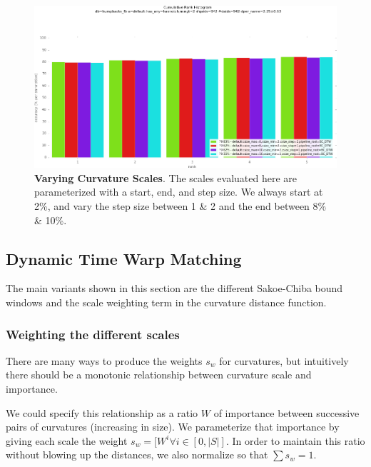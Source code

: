 \begin{figure}[t]%
\centering
\includegraphics[width=1\textwidth]{../images/results/vary_curv_scales.png}
\caption[]{\textbf{Varying Curvature Scales}. The scales evaluated here are parameterized with a start, end, and step size. We always start at 2\%, and vary the step size between 1 \& 2 and the end between 8\% \& 10\%.}
\label{fig:vary_curv_scales}
\end{figure}

\subsection{Dynamic Time Warp Matching}

The main variants shown in this section are the different Sakoe-Chiba bound windows and the scale weighting term in the curvature distance function.

\subsubsection{Weighting the different scales}

There are many ways to produce the weights $s_w$ for curvatures, but intuitively there should be a monotonic relationship between curvature scale and importance.

We could specify this relationship as a ratio $W$ of importance between successive pairs of curvatures (increasing in size).
We parameterize that importance by giving each scale the weight $s_w = [W^i \forall i \in [0,|S|]$.
In order to maintain this ratio without blowing up the distances, we also normalize so that $\sum s_w = 1$.

